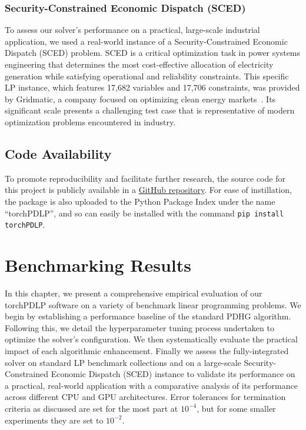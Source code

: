 \documentclass[twoside,12pt,openright]{report}  %
\newcommand\myclearpage{\cleartooddpage
  [\thispagestyle{empty}]
  }
\begin{document}
\subsection{Security-Constrained Economic Dispatch (SCED)} \label{sec:SCED}
To assess our solver's performance on a practical, large-scale industrial application, we used a real-world instance of a Security-Constrained Economic Dispatch (SCED) problem. SCED is a critical optimization task in power systems engineering that determines the most cost-effective allocation of electricity generation while satisfying operational and reliability constraints. This specific LP instance, which features 17,682 variables and 17,706 constraints, was provided by Gridmatic, a company focused on optimizing clean energy markets~\cite{gridmatic}. Its significant scale presents a challenging test case that is representative of modern optimization problems encountered in industry.

\section{Code Availability}
To promote reproducibility and facilitate further research, the source code for this project is publicly available in a \href{https://github.com/SimplySnap/torchPDLP/tree/pypi-package}{GitHub repository}. For ease of instillation, the package is also uploaded to the Python Package Index under the name ``torchPDLP'', and so can easily be installed with the command \texttt{pip install torchPDLP}.

\ifthenelse{\boolean{@twoside}}{\myclearpage}{}
\chapter{Benchmarking Results}\label{chap:results}
In this chapter, we present a comprehensive empirical evaluation of our torchPDLP software on a variety of benchmark linear programming problems. We begin by establishing a performance baseline of the standard PDHG algorithm. Following this, we detail the hyperparameter tuning process undertaken to optimize the solver's configuration. We then systematically evaluate the practical impact of each algorithmic enhancement. Finally we assess the fully-integrated solver on standard LP benchmark collections and on a large-scale Security-Constrained Economic Dispatch (SCED) instance to validate its performance on a practical, real-world application with a comparative analysis of its performance across different CPU and GPU architectures. Error tolerances for termination criteria as discussed are set for the most part at $10^{-4}$, but for some smaller experiments they are set to $10^{-2}$.
\end{document}
